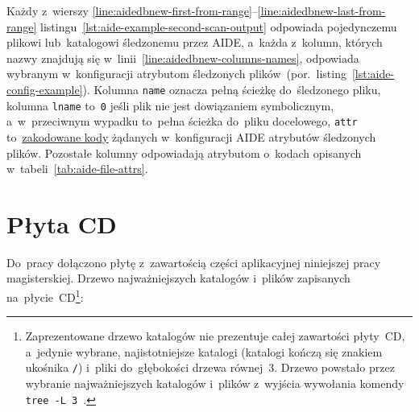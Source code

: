 \documentclass[thesis]{subfiles}
\begin{document}
\begin{appendices}
Każdy z~wierszy \ref{line:aidedbnew-first-from-range}--\ref{line:aidedbnew-last-from-range} listingu~\ref{lst:aide-example-second-scan-output} odpowiada pojedynczemu plikowi lub~katalogowi śledzonemu przez AIDE, a~każda z~kolumn, których nazwy znajdują się w~linii~\ref{line:aidedbnew-columns-names}, odpowiada wybranym w~konfiguracji atrybutom śledzonych plików~(por.~listing~\ref{lst:aide-config-example}). Kolumna \texttt{name} oznacza pełną ścieżkę do~śledzonego pliku, kolumna \texttt{lname} to~\texttt{0} jeśli plik nie jest dowiązaniem symbolicznym, a~w~przeciwnym wypadku to~pełna ścieżka do~pliku docelowego, \texttt{attr} to~\href{https://unix.stackexchange.com/questions/342693/understanding-aide-db/343020}{zakodowane kody} żądanych w~konfiguracji AIDE atrybutów śledzonych plików. Pozostałe kolumny odpowiadają atrybutom o~kodach opisanych w~tabeli~\ref{tab:aide-file-attrs}.



\chapter{Płyta CD}
\label{ch:cd-appendix}

Do~pracy dołączono płytę z~zawartością części aplikacyjnej niniejszej pracy magisterskiej. Drzewo najważniejszych katalogów i~plików zapisanych na~płycie~CD\footnote{Zaprezentowane drzewo katalogów nie prezentuje całej zawartości płyty~CD, a~jedynie wybrane, najistotniejsze katalogi (katalogi kończą się znakiem ukośnika \texttt{/}) i~pliki do~głębokości drzewa równej~3. Drzewo powstało przez wybranie najważniejszych katalogów i~plików z~wyjścia wywołania komendy \mbox{\texttt{tree~-L~3}}~\cite{tree-manual}.}:

{\footnotesize
{}
}




\end{appendices}
\end{document}
